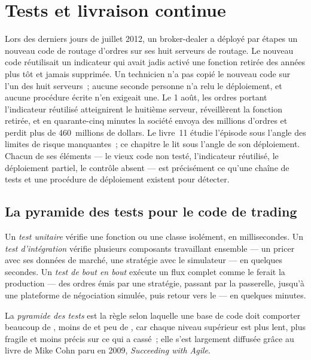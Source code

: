 \chapter{Tests et livraison continue}\label{ch:pl:testing-and-continuous-delivery}

Lors des derniers jours de juillet 2012, un broker-dealer a déployé par étapes un nouveau code de routage d'ordres sur ses huit serveurs de routage. Le nouveau code réutilisait un
indicateur qui avait jadis activé une fonction retirée des années plus tôt et jamais supprimée. Un technicien n'a pas copié le nouveau code sur l'un des huit
serveurs~; aucune seconde personne n'a relu le déploiement, et aucune procédure écrite n'en exigeait une. Le 1 août, les ordres portant l'indicateur réutilisé atteignirent
le huitième serveur, réveillèrent la fonction retirée, et en quarante-cinq minutes la société envoya des millions d'ordres et perdit plus de 460~millions de dollars. Le livre~11
étudie l'épisode sous l'angle des limites de risque manquantes~; ce chapitre le lit sous l'angle de son déploiement. Chacun de ses éléments --- le vieux code non testé,
l'indicateur réutilisé, le déploiement partiel, le contrôle absent --- est précisément ce qu'une chaîne de tests et une procédure de déploiement existent pour détecter.

\section{La pyramide des tests pour le code de trading}

\begin{definition}\label{def:pl:testing-and-continuous-delivery:tests}
Un \emph{test unitaire} vérifie une fonction ou une classe isolément, en millisecondes. Un
\emph{test d'intégration} vérifie plusieurs composants travaillant ensemble --- un pricer avec ses données de marché, une stratégie avec le simulateur --- en quelques secondes. Un
\emph{test de bout en bout} exécute un flux complet comme le ferait la production --- des ordres émis par une stratégie, passant par la passerelle, jusqu'à
une plateforme de négociation simulée, puis retour vers le  --- en quelques minutes.
\end{definition}

\begin{definition}\label{def:pl:testing-and-continuous-delivery:pyramid}
La \emph{pyramide des tests} est la règle selon laquelle une base de code doit comporter beaucoup de , moins de  et peu
de , car chaque niveau supérieur est plus lent, plus fragile et moins précis sur ce qui a cassé~; elle s'est largement diffusée grâce au livre de Mike Cohn
paru en 2009, \emph{Succeeding with Agile}.
\end{definition}


